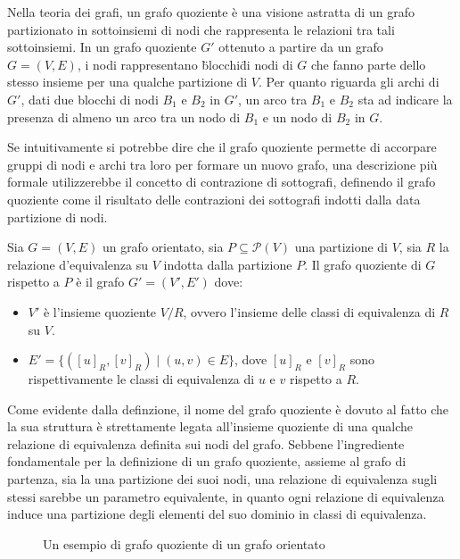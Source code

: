 Nella teoria dei grafi, un grafo quoziente \`e una visione astratta di un grafo partizionato in sottoinsiemi di nodi
che rappresenta le relazioni tra tali sottoinsiemi.
In un grafo quoziente $G'$ ottenuto a partire da un grafo $G = (V, E)$, i nodi rappresentano \"blocchi\" di nodi di $G$
che fanno parte dello stesso insieme per una qualche partizione di $V$.
Per quanto riguarda gli archi di $G'$, dati due blocchi di nodi $B_1$ e $B_2$ in $G'$, un arco tra $B_1$ e $B_2$ sta
ad indicare la presenza di almeno un arco tra un nodo di $B_1$ e un nodo di $B_2$ in $G$. \newline

Se intuitivamente si potrebbe dire che il grafo quoziente permette di accorpare gruppi di nodi e archi tra loro
per formare un nuovo grafo, una descrizione pi\`u formale utilizzerebbe il concetto di contrazione di sottografi,
definendo il grafo quoziente come il risultato delle contrazioni dei sottografi indotti dalla data partizione di nodi.

\begin{definition}
Sia $G = (V, E)$ un grafo orientato, sia $P \subseteq \mathcal{P}(V)$ una partizione di $V$, sia $R$ la relazione
d'equivalenza su $V$ indotta dalla partizione $P$.
Il grafo quoziente di $G$ rispetto a $P$ \`e il grafo $G' = (V', E')$ dove:
    \begin{itemize}
        \item $V'$ \`e l'insieme quoziente $V/R$, ovvero l'insieme delle classi di equivalenza di $R$ su $V$.
        \item $E' = \{([u]_R, [v]_R) \mid (u, v) \in E\}$, dove $[u]_R$ e $[v]_R$ sono rispettivamente le classi di
        equivalenza di $u$ e $v$ rispetto a $R$.
    \end{itemize}
\end{definition}

Come evidente dalla definzione, il nome del grafo quoziente \`e dovuto al fatto che la sua struttura \`e
strettamente legata all'insieme quoziente di una qualche relazione di equivalenza definita sui nodi del grafo.
Sebbene l'ingrediente fondamentale per la definizione di un grafo quoziente, assieme al grafo di partenza, sia la
una partizione dei suoi nodi, una relazione di equivalenza sugli stessi sarebbe un parametro equivalente, in quanto
ogni relazione di equivalenza induce una partizione degli elementi del suo dominio in classi di equivalenza. \newline

\begin{figure}[h]
    \centering
    
    \caption{Un esempio di grafo quoziente di un grafo orientato}
    \label{fig:quotient-graph-example} %
\end{figure}

